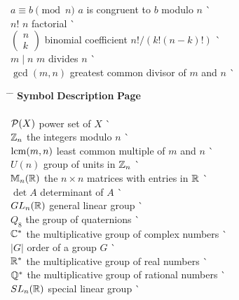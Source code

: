 \begin{tabbing}
$a \equiv b \pmod{n}$ \> $a$ is congruent to $b$ modulo $n$ \> 
     \` \pageref{amodb} \\
$n!$ \> $n$ factorial \> \` \pageref{factorial} \\
$\left(\begin{array}{c}n \\ k \end{array} \right)$ \> binomial
     coefficient $n!/(k! (n-k)!)$ \> \` \pageref{binomial} \\
$m \mid n$ \> $m$ divides $n$ \> \` \pageref{divides} \\
$\gcd(m, n)$ \> greatest common divisor of $m$ and $n$ \>
     \` \pageref{greatestcd}
\end{tabbing} \clearpage
\begin{tabbing}
\hspace{1.5in} \= \hspace{2.5in} \= \kill     
{\bf Symbol}  \> {\bf Description} \>  \` {\bf Page} \\ 
     \mbox{\hspace*{1in}} \\
${\cal P}(X)$ \> power set of $X$ \> \` \pageref{powerset} \\
${\Bbb Z}_n$ \> the integers modulo $n$ \> \` \pageref{integersmodn} \\
$\operatorname{lcm}(m,n)$ \> least common multiple of $m$ and $n$ \>
     \` \pageref{leastcm} \\
$U(n)$ \> group of units in ${\Bbb Z}_n$ \> \` \pageref{groupofunits} \\
${\Bbb M}_n ( {\Bbb R})$ \> the $n \times n$ matrices with entries in
     ${\Bbb R}$ \> \`  \pageref{notematrices} \\
$\det A$ \> determinant of $A$ \> \` \pageref{determinant} \\
$GL_n({\Bbb R})$ \> general linear group \> \` \pageref{generallinear} \\
$Q_8$ \> the group of quaternions \> \` \pageref{notequateriongroup} \\
${\Bbb C}^\ast$ \> the multiplicative group of complex numbers \>
     \` \pageref{noteCstar} \\
$|G|$ \> order of a group $G$ \> \` \pageref{noteorder} \\
${\Bbb R}^*$ \> the multiplicative group of real numbers \>
     \` \pageref{noteRstar} \\
${\Bbb Q}^*$ \> the multiplicative group of rational numbers \>
     \` \pageref{noteQstar} \\
$SL_n({\Bbb R})$ \> special linear group \> \` \pageref{speciallinear} \\

\end{tabbing}
